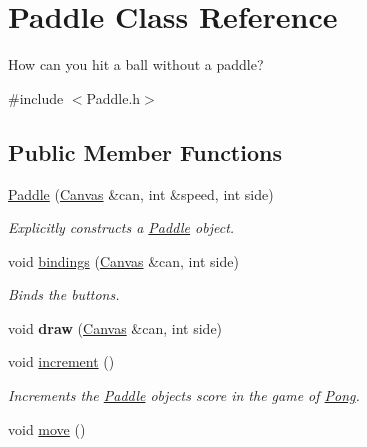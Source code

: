 \hypertarget{class_paddle}{}\section{Paddle Class Reference}
\label{class_paddle}


How can you hit a ball without a paddle?  




{\ttfamily \#include $<$Paddle.\+h$>$}

\subsection*{Public Member Functions}
\begin{DoxyCompactItemize}
\item 
\hyperlink{class_paddle_a5c98ebac2d944073072225b1bb11180a}{Paddle} (\hyperlink{classtsgl_1_1_canvas}{Canvas} \&can, int \&speed, int side)
\begin{DoxyCompactList}\small\item\em Explicitly constructs a \hyperlink{class_paddle}{Paddle} object. \end{DoxyCompactList}\item 
void \hyperlink{class_paddle_ab90901e8e4a4cbf0c99c537583b6ee30}{bindings} (\hyperlink{classtsgl_1_1_canvas}{Canvas} \&can, int side)
\begin{DoxyCompactList}\small\item\em Binds the buttons. \end{DoxyCompactList}\item 
\mbox{\label{class_paddle_af18182f0940b764f8e47992f77d3c9dd}} 
void {\bfseries draw} (\hyperlink{classtsgl_1_1_canvas}{Canvas} \&can, int side)
\item 
\mbox{\label{class_paddle_a05d45fe2ca65d7baade4162c56a478f0}} 
void \hyperlink{class_paddle_a05d45fe2ca65d7baade4162c56a478f0}{increment} ()
\begin{DoxyCompactList}\small\item\em Increments the \hyperlink{class_paddle}{Paddle} object\textquotesingle{}s score in the game of \hyperlink{class_pong}{Pong}. \end{DoxyCompactList}\item 
\mbox{\label{class_paddle_af7552932092d5618b971cd67cefc485f}} 
void \hyperlink{class_paddle_af7552932092d5618b971cd67cefc485f}{move} ()

\end{DoxyCompactItemize}
